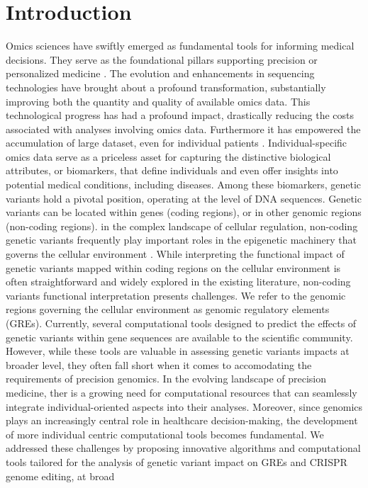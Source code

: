 \documentclass[a4paper, titlepage, openright]{book}
\newcommand{\mychapter}[2]{
    \setcounter{chapter}{#1}
    \setcounter{section}{0}
    \chapter*{#2}
    \addcontentsline{toc}{chapter}{#2}
}
\begin{document}
\begin{frontespizio}
\end{frontespizio}
\tableofcontents
\listoffigures
\listoftables
\mychapter{1}{Introduction}
Omics sciences have swiftly emerged as fundamental tools for informing medical decisions. They serve as the foundational pillars supporting precision or personalized medicine \citep{ginsburg2009genomic}.  The evolution and enhancements in sequencing technologies have brought about a profound transformation, substantially improving both the quantity and quality of available omics data. This technological progress has had a profound impact, drastically reducing the costs associated with analyses involving omics data. Furthermore it has empowered the accumulation of large dataset, even for individual patients \citep{voelkerding2009next}.  Individual-specific omics data serve as a priceless asset for capturing the distinctive biological attributes,  or biomarkers, that define individuals and even offer insights into potential medical conditions, including diseases. Among these biomarkers, genetic variants hold a pivotal position, operating at the level of DNA sequences. Genetic variants can be located within genes (coding regions), or in other genomic regions (non-coding regions). in the complex landscape of cellular regulation, non-coding genetic variants frequently play important roles in the epigenetic machinery that governs the cellular environment \citep{maurano2012systematic}. While interpreting the functional impact of genetic variants mapped within coding regions on the cellular environment is often straightforward and widely explored in the existing literature, non-coding variants functional interpretation presents challenges.  We refer to the genomic regions governing the cellular environment as genomic regulatory elements (GREs). Currently, several computational tools designed to predict the effects of genetic variants within gene sequences are available to the scientific community.  However,  while these tools are valuable in assessing genetic variants impacts at broader level, they often fall short when it comes to accomodating the requirements of precision genomics.  In the evolving landscape of precision medicine, ther is a growing need for computational resources that can seamlessly  integrate individual-oriented aspects into their analyses.  Moreover, since genomics plays an increasingly central role in healthcare decision-making, the development of more individual centric computational tools becomes fundamental. We addressed these challenges by proposing innovative algorithms and computational tools tailored for the analysis of genetic variant impact on GREs and CRISPR genome editing, at broad 
\end{document}
